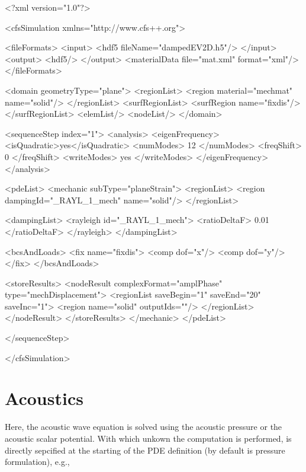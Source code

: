 {\footnotesize 
\begin{xmllisting}
<?xml version="1.0"?>

<cfsSimulation xmlns="http://www.cfs++.org">

  <fileFormats>
    <input>
      <hdf5 fileName="dampedEV2D.h5"/>
    </input>
    <output>
      <hdf5/>
    </output>
    <materialData file="mat.xml" format="xml"/>
  </fileFormats>

  <domain geometryType="plane">
    <regionList>
      <region material="mechmat" name="solid"/>
    </regionList>
    <surfRegionList>
      <surfRegion name="fixdis"/>
    </surfRegionList>
    <elemList/>
    <nodeList/>
  </domain>

  <sequenceStep index="1">
    <analysis>
      <eigenFrequency>
        <isQuadratic>yes</isQuadratic>
        <numModes> 12 </numModes>
        <freqShift> 0 </freqShift>
        <writeModes> yes </writeModes>
      </eigenFrequency>
    </analysis>
    
    <pdeList>
      <mechanic subType="planeStrain">
        <regionList>
          <region dampingId="_RAYL_1_mech" name="solid"/>
        </regionList>

        <dampingList>
          <rayleigh id="_RAYL_1_mech">
            <ratioDeltaF> 0.01 </ratioDeltaF>
          </rayleigh>
        </dampingList>

        <bcsAndLoads>
          <fix name="fixdis">
            <comp dof="x"/>
            <comp dof="y"/>
          </fix>
        </bcsAndLoads>
        
        <storeResults>
          <nodeResult complexFormat="amplPhase" type="mechDisplacement">
            <regionList saveBegin="1" saveEnd="20" saveInc="1">
              <region name="solid" outputIds=""/>
            </regionList>
          </nodeResult>
        </storeResults>
      </mechanic>
    </pdeList>
    
  </sequenceStep>

</cfsSimulation>
\end{xmllisting}
}


\newpage
\section{Acoustics}
Here, the acoustic wave equation is solved using the acoustic pressure
or the acoustic scalar potential. With which unkown the computation is
performed, is directly sepcified at the starting of the PDE
definition (by default is pressure formulation), e.g.,

